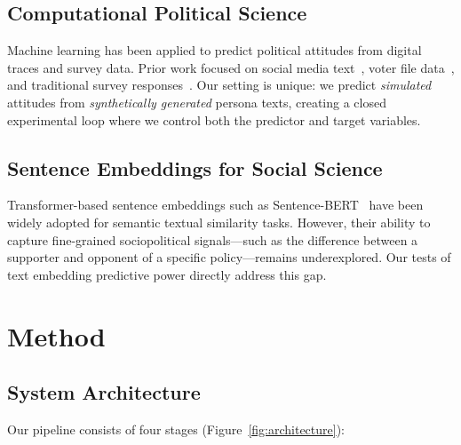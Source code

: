 \documentclass[11pt,a4paper]{article}
\begin{document}
\subsection{Computational Political Science}

Machine learning has been applied to predict political attitudes from digital traces and survey data. Prior work focused on social media text~\cite{barbera2015tweeting}, voter file data~\cite{hersh2015hacking}, and traditional survey responses~\cite{montgomery2018predicting}. Our setting is unique: we predict \textit{simulated} attitudes from \textit{synthetically generated} persona texts, creating a closed experimental loop where we control both the predictor and target variables.

\subsection{Sentence Embeddings for Social Science}

Transformer-based sentence embeddings such as Sentence-BERT~\cite{reimers2019sentence} have been widely adopted for semantic textual similarity tasks. However, their ability to capture fine-grained sociopolitical signals---such as the difference between a supporter and opponent of a specific policy---remains underexplored. Our tests of text embedding predictive power directly address this gap.

\section{Method}

\subsection{System Architecture}

Our pipeline consists of four stages (Figure~\ref{fig:architecture}):
\end{document}
